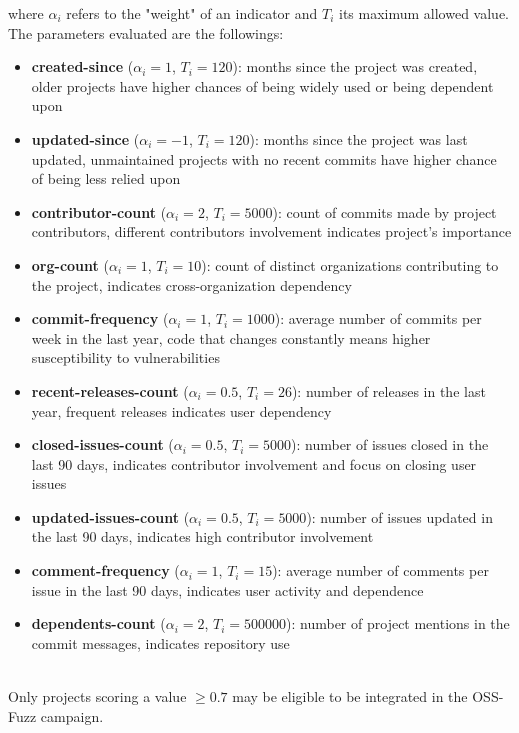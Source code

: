 where $\alpha_i$ refers to the "weight" of an indicator and $T_i$ its maximum allowed value.
The parameters evaluated are the followings:
\begin{itemize}
    \item \textbf{created-since} ($\alpha_i = 1$, $T_i = 120$): months since the project was created, older projects have higher chances of being widely used or being dependent upon
    \item \textbf{updated-since} ($\alpha_i = -1$, $T_i = 120$): months since the project was last updated, unmaintained projects with no recent commits have higher chance of being less relied upon
    \item \textbf{contributor-count} ($\alpha_i = 2$, $T_i = 5000$): count of commits made by project contributors, different contributors involvement indicates project's importance
    \item \textbf{org-count} ($\alpha_i = 1$, $T_i = 10$): count of distinct organizations contributing to the project, indicates cross-organization dependency
    \item \textbf{commit-frequency} ($\alpha_i = 1$, $T_i = 1000$): average number of commits per week in the last year, code that changes constantly means higher susceptibility to vulnerabilities
    \item \textbf{recent-releases-count} ($\alpha_i = 0.5$, $T_i = 26$): number of releases in the last year, frequent releases indicates user dependency
    \item \textbf{closed-issues-count} ($\alpha_i = 0.5$, $T_i = 5000$): number of issues closed in the last 90 days, indicates contributor involvement and focus on closing user issues
    \item \textbf{updated-issues-count} ($\alpha_i = 0.5$, $T_i = 5000$): number of issues updated in the last 90 days, indicates high contributor involvement
    \item \textbf{comment-frequency} ($\alpha_i = 1$, $T_i = 15$): average number of comments per issue in the last 90 days, indicates  user activity and dependence
    \item \textbf{dependents-count} ($\alpha_i = 2$, $T_i = 500000$): number of project mentions in the commit messages, indicates repository use
\end{itemize}
\ \\
Only projects scoring a value $\geq 0.7$ may be eligible to be integrated in the OSS-Fuzz campaign.


